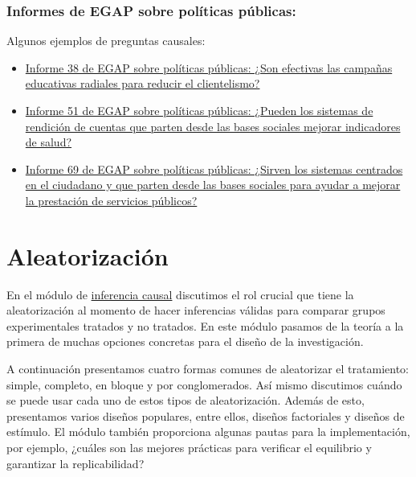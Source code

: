 \documentclass[12pt,spanish,]{book}
\begin{document}
\hypertarget{informes-de-egap-sobre-poluxedticas-puxfablicas}{%
\subsection{Informes de EGAP sobre políticas públicas:}\label{informes-de-egap-sobre-poluxedticas-puxfablicas}}

Algunos ejemplos de preguntas causales:

\begin{itemize}
\item
  \href{https://egap.org/resource/brief-38-diminishing-the-effectiveness-of-vote-buying-through-voter-education/}{Informe 38 de EGAP sobre políticas públicas: ¿Son efectivas las campañas educativas radiales para reducir el clientelismo?}
\item
  \href{https://egap.org/resource/does-information-technology-improve-public-service-delivery-lessons-from-uganda/}{Informe 51 de EGAP sobre políticas públicas: ¿Pueden los sistemas de rendición de cuentas que parten desde las bases sociales mejorar indicadores de salud?}
\item
  \href{https://egap.org/resource/brief-69-bottom-up-accountability-and-public-service-provision-in-brazil/}{Informe 69 de EGAP sobre políticas públicas: ¿Sirven los sistemas centrados en el ciudadano y que parten desde las bases sociales para ayudar a mejorar la prestación de servicios públicos?}
\end{itemize}

\hypertarget{aleatorizaciuxf3n}{%
\chapter{Aleatorización}\label{aleatorizaciuxf3n}}

En el módulo de \href{inferencia-causal.html}{inferencia causal} discutimos el rol crucial que tiene la aleatorización al momento de hacer inferencias válidas para comparar grupos experimentales tratados y no tratados. En este módulo pasamos de la teoría a la primera de muchas opciones concretas para el diseño de la investigación.

A continuación presentamos cuatro formas comunes de aleatorizar el tratamiento: simple, completo, en bloque y por conglomerados. Así mismo discutimos cuándo se puede usar cada uno de estos tipos de aleatorización. Además de esto, presentamos varios diseños populares, entre ellos, diseños factoriales y diseños de estímulo. El módulo también proporciona algunas pautas para la implementación, por ejemplo, ¿cuáles son las mejores prácticas para verificar el equilibrio y garantizar la replicabilidad?
\end{document}
